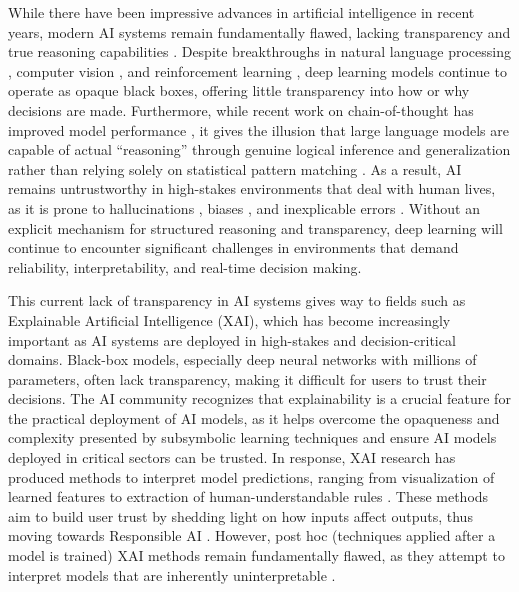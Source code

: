While there have been impressive advances in artificial intelligence in recent years, modern AI systems remain fundamentally flawed, lacking transparency and true reasoning capabilities \cite{jiang2024peektokenbiaslarge}. Despite breakthroughs in natural language processing \cite{nlp_deep_learning_survey}, computer vision \cite{cv_deep_learning_survey}, and reinforcement learning \cite{rl_deep_learning_survey}, deep learning models continue to operate as opaque black boxes, offering little transparency into how or why decisions are made. Furthermore, while recent work on chain-of-thought has improved model performance \cite{wei2023chainofthoughtpromptingelicitsreasoning}, it gives the illusion that large language models are capable of actual ``reasoning'' through genuine logical inference and generalization rather than relying solely on statistical pattern matching \cite{bastounis2024consistentreasoningparadoxintelligence, li202512surveyreasoning, cherian2023deepneuralnetworkssmarter}. As a result, AI remains untrustworthy in high-stakes environments that deal with human lives, as it is prone to hallucinations \cite{maleki2024aihallucinationsmisnomerworth}, biases \cite{simhi2025trustmeimwrong, echterhoff2024cognitivebiasdecisionmakingllms}, and inexplicable errors \cite{rogha2023explaindecidehumancentricreview}. Without an explicit mechanism for structured reasoning and transparency, deep learning will continue to encounter significant challenges in environments that demand reliability, interpretability, and real-time decision making.

This current lack of transparency in AI systems gives way to fields such as Explainable Artificial Intelligence (XAI), which has become increasingly important as AI systems are deployed in high-stakes and decision-critical domains. Black-box models, especially deep neural networks with millions of parameters, often lack transparency, making it difficult for users to trust their decisions. The AI community recognizes that explainability is a crucial feature for the practical deployment of AI models, as it helps overcome the opaqueness and complexity presented by subsymbolic learning techniques and ensure AI models deployed in critical sectors can be trusted.
In response, XAI research has produced methods to interpret model predictions, ranging from visualization of learned features to extraction of human-understandable rules \cite{interpreting-nns}. These methods aim to build user trust by shedding light on how inputs affect outputs, thus moving towards Responsible AI \cite{baker2023explainableairesponsibleai}. However, post hoc (techniques applied after a model is trained) XAI methods remain fundamentally flawed, as they attempt to interpret models that are inherently uninterpretable \cite{inscrutable_xai_algorithms}. 

